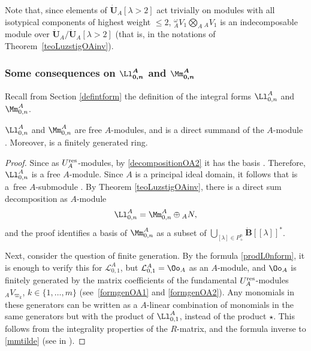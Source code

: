\begin{exa}
{Note that, since elements of $\dot{\mathbf{U}}_A [\lambda > 2]$ act trivially on modules with all isotypical components of highest weight $\leq 2$, ${}_A^\omega V_1\bigotimes_A {}_AV_1$ is an indecomposable module over $\dot{\mathbf{U}}_A / \dot{\mathbf{U}}_A [\lambda > 2]$ (that is,  in the notations of Theorem~\ref{teoLuzstigOAinv}).}\end{exa}

\subsubsection[Some consequences on L\_{0,n}\^A and M\_{0,n}\^A]{Some consequences on $\boldsymbol{\Ll_{0,n}^A}$ and $\boldsymbol{\Mm_{0,n}^A}$}

Recall from Section \ref{defintform} the definition of the integral forms $\Ll_{0,n}^A$ and $\Mm_{0,n}^A$.
\begin{prop}\label{L0NAfgfree} $\Ll_{0,n}^A$ and $\Mm_{0,n}^A$ are free $A$-modules, and  is a direct summand of the $A$-module . Moreover,  is a finitely generated ring.
\end{prop}
\begin{proof} Since  as $U_A^{\rm res}$-modules, by \eqref{decompositionOA2} it has the basis . Therefore, $\Ll_{0,n}^A$ is a free $A$-module. Since $A$ is a principal ideal domain, it follows that  is a~free $A$-submodule \cite[Appendix~2.2]{Lang}. By Theorem \ref{teoLuzstigOAinv}, there is a direct sum decomposition as $A$-module
\begin{equation}\label{decomposition OAn}
\Ll_{0,n}^A = \Mm_{0,n}^A \oplus {}_AN,
\end{equation} and the proof identifies a basis of $\Mm_{0,n}^A$ as a subset of $\bigcup_{[\lambda]\in P_+^n}\dot{\mathbf{B}} [[\lambda]]^*$.

Next, consider the question of finite generation. By the formula \eqref{prodL0nform}, it is enough to verify this for ${\mathcal L}_{0,1}^A$, but ${\mathcal L}_{0,1}^A= \Oo_A$ as an $A$-module, and $\Oo_A$ is finitely generated by the matrix coefficients of the fundamental $U_A^{\rm res}$-modules ${}_AV_{\varpi_k}$, $k\in\{1,\dots,m\}$ (see~\eqref{formgenOA1} and \eqref{formgenOA2}). Any monomials in these generators can be written as a $A$-linear combination of monomials in the same generators but with the product of $\Ll_{0,1}^A$, instead of the product $\star$. This follows from the integrality properties of the $R$-matrix, and the formula inverse to \eqref{mmtilde} (see in \cite[Section 3.3 and the formulas (4.6)--(4.8)]{BR}).
\end{proof}

